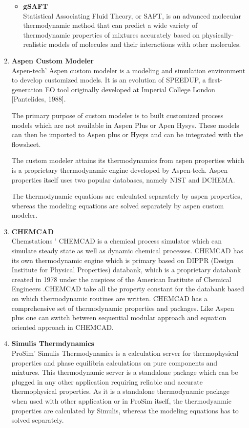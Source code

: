 \documentclass[12pt]{report}
\begin{document}
\begin{enumerate}
\begin{itemize}
\item \textbf{gSAFT} \\
Statistical Associating Fluid Theory, or SAFT, is an advanced molecular thermodynamic method that can predict a wide variety of thermodynamic properties of mixtures accurately based on physically-realistic models of molecules and their interactions with other molecules.
\end{itemize}

\item{\textbf{Aspen Custom Modeler}} \\
Aspen-tech' Aspen custom modeler is a modeling and simulation environment to develop customized models. It is an evolution of SPEEDUP, a first-generation EO
tool originally developed at Imperial College London [Pantelides, 1988].

The primary purpose of custom modeler is to built customized process models which are not available in Aspen Plus or Apen Hysys. These models can then be imported to Aspen plus or Hysys and can be integrated with the flowsheet. 

The custom modeler attains its thermodynamics from aspen properties which is a proprietary thermodynamic engine developed by Aspen-tech. Aspen properties itself uses two popular databases, namely NIST and DCHEMA.

The thermodynamic equations are calculated separately by aspen properties, whereas the modeling equations are solved separately by aspen custom modeler. \cite{ACM}

\item{\textbf{CHEMCAD}} \\
Chemstations ' CHEMCAD \cite{Chemcad}  is a chemical process simulator which can simulate steady state as well as dynamic chemical processes. CHEMCAD has its own thermodynamic engine which is primary based on DIPPR (Design Institute for Physical Properties) databank, which is a proprietary databank created in 1978 under the auspices of the American Institute of Chemical Engineers \cite{DIPPR}.CHEMCAD take all the property constant for the databank based on which thermodynamic routines are written. CHEMCAD has a comprehensive set of thermodynamic properties and packages. Like Aspen plus one can switch between sequential modular approach and equation oriented approach in CHEMCAD.
 
\item{\textbf{Simulis Thermdynamics}} \\
ProSim' Simulis Thermodynamics \cite{Simulis} is a calculation server for thermophysical properties and phase equilibria calculations on pure components and mixtures. This thermodynamic server is a standalone package which can be plugged in any other application requiring reliable and accurate thermophysical properties. As it is a standalone thermodynamic package when used with other application or in ProSim itself, the thermodyanmic properties are calculated by Simulis, whereas the modeling equations has to solved separately.  


\end{enumerate}
\end{document}
